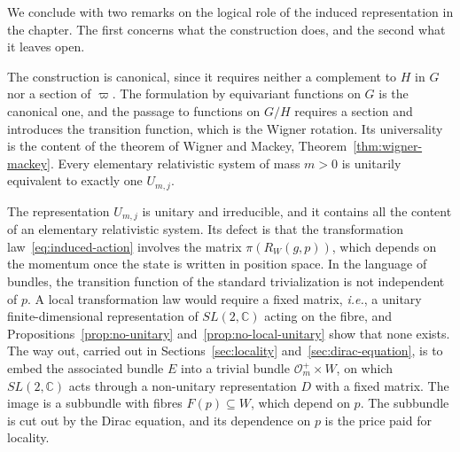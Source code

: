 	We conclude with two remarks on the logical role of the induced representation in the chapter. The first concerns what the construction does, and the second what it leaves open.
	
	\begin{remark}\label{rem:induced-canonicity}
		The construction is canonical, since it requires neither a complement to $H$ in $G$ nor a section of $\varpi$. The formulation by equivariant functions on $G$ is the canonical one, and the passage to functions on $G/H$ requires a section and introduces the transition function, which is the Wigner rotation. Its universality is the content of the theorem of Wigner and Mackey, Theorem~\ref{thm:wigner-mackey}. Every elementary relativistic system of mass $m>0$ is unitarily equivalent to exactly one $U_{m,j}$.
	\end{remark}
	
	\begin{remark}\label{rem:induced-problem}
		The representation $U_{m,j}$ is unitary and irreducible, and it contains all the content of an elementary relativistic system. Its defect is that the transformation law~\eqref{eq:induced-action} involves the matrix $\pi(R_W(g,p))$, which depends on the momentum once the state is written in position space. In the language of bundles, the transition function of the standard trivialization is not independent of $p$. A local transformation law would require a fixed matrix, \textit{i.e.}, a unitary finite-dimensional representation of $SL(2,\mathbb{C})$ acting on the fibre, and Propositions~\ref{prop:no-unitary} and~\ref{prop:no-local-unitary} show that none exists. The way out, carried out in Sections~\ref{sec:locality} and~\ref{sec:dirac-equation}, is to embed the associated bundle $E$ into a trivial bundle $\mathcal{O}_m^+\times W$, on which $SL(2,\mathbb{C})$ acts through a non-unitary representation $D$ with a fixed matrix. The image is a subbundle with fibres $F(p)\subseteq W$, which depend on $p$. The subbundle is cut out by the Dirac equation, and its dependence on $p$ is the price paid for locality.
	\end{remark}
